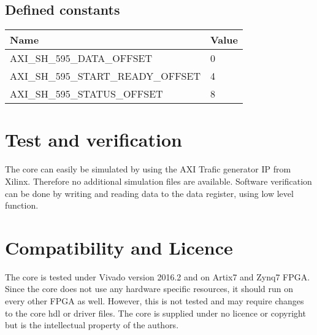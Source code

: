 \subsection{Defined constants}

\begin{table}[h]
	\centering
	\label{tbl::software_defines}
	\begin{tabular}{l|l}
		Name & Value \\
		\hline 
		AXI\_SH\_595\_DATA\_OFFSET & 0 \\
		\hline 
		AXI\_SH\_595\_START\_READY\_OFFSET & 4 \\
		\hline 
		AXI\_SH\_595\_STATUS\_OFFSET & 8 \\
	\end{tabular} 
	
\end{table}


\section{Test and verification}
\label{sec::test}

The core can easily be simulated by using the AXI Trafic generator IP from Xilinx.
Therefore no additional simulation files are available.
Software verification can be done by writing and reading data to the data register, using low level function.

\section{Compatibility and Licence}
The core is tested under Vivado version 2016.2 and on Artix7 and Zynq7 FPGA.
Since the core does not use any hardware specific resources, it should run on every other FPGA as well.
However, this is not tested and may require changes to the core hdl or driver files.
The core is supplied under no licence or copyright but is the intellectual property of the authors.


